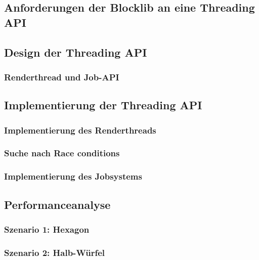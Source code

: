 \documentclass[12pt,a4paper,listof=totocnumbered,parskip=half,numbers=noenddot]{scrartcl}
\begin{document}
\subsection{Anforderungen der Blocklib an eine Threading API}\label{sec:anforderungen}


\subsection{Design der Threading API}

\subsubsection{Renderthread und Job-API}


\subsection{Implementierung der Threading API}

\subsubsection{Implementierung des Renderthreads}


\subsubsection{Suche nach Race conditions}

\subsubsection{Implementierung des Jobsystems}


\subsection{Performanceanalyse}

\subsubsection{Szenario 1: Hexagon}

\subsubsection{Szenario 2: Halb-Würfel}

\end{document}

